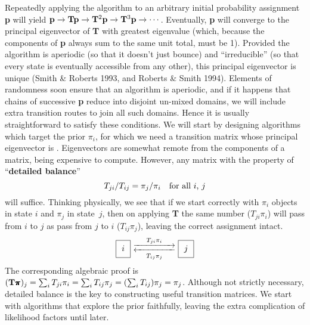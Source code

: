Repeatedly applying the algorithm to an arbitrary initial probability assignment {\bf p} 
will yield ${\bf p} \rightarrow {\bf T}{\bf p} \rightarrow {\bf T}^2{\bf p} \rightarrow {\bf T}^3{\bf p} \rightarrow \cdots\,$.
Eventually, {\bf p} will converge to the principal eigenvector of {\bf T} with greatest eigenvalue
(which, because the components of {\bf p} always sum to the same unit total, must be 1).
Provided the algorithm is aperiodic (so that it doesn't just bounce) and ``irreducible'' (so that every state is eventually accessible from any other),
this principal eigenvector is unique (Smith \& Roberts 1993, and Roberts \& Smith 1994).
Elements of randomness soon ensure that an algorithm is aperiodic, 
and if it happens that chains of successive {\bf p} reduce into disjoint un-mixed domains, 
we will include extra transition routes to join all such domains.
Hence it is usually straightforward to satisfy these conditions.
We will start by designing algorithms which target the prior $\pi_i$, for which we need a transition matrix whose principal eigenvector is \bfpi.
Eigenvectors are somewhat remote from the components of a matrix, being expensive to compute.  
However, any matrix with the property of ``{\bf detailed balance}''
$$
    T_{ji} / T_{ij} = \pi_j / \pi_i \quad \hbox{for all $i$, $j$}
$$
will suffice.
Thinking physically, we see that if we start correctly with $\pi_i$ objects in state $i$ and $\pi_j$ in state~$j$, 
then on applying {\bf T} the same number ($T_{ji}\pi_i$) will pass from $i$ to $j$ as pass from $j$ to $i$ ($T_{ij}\pi_j$), leaving the correct assignment intact.
$$
\hbox{
       \vbox{\offinterlineskip
             \hrule
             \halign{&\vrule#&\strut\ \ \hfil#\hfil\ &\vrule#\cr
                     height4pt & \omit && \omit \cr
                               &  $i$  &  \cr
                     height4pt & \omit && \omit \cr
                    }
             \hrule
            }
       \vbox{ \hbox{${\buildrel         T_{ji}\pi_i            \over      {\hbox to 50pt{\rightarrowfill}}}      $}
              \hbox{${\buildrel {\displaystyle{\hbox to 50pt{\leftarrowfill}}} \over {\scriptstyle{T_{ij}\pi_j}}}$} }
       \vbox{\offinterlineskip
             \hrule
             \halign{&\vrule#&\strut\ \ \hfil#\hfil\ &\vrule#\cr
                     height4pt & \omit && \omit \cr
                               &  $j$  &  \cr
                     height4pt & \omit && \omit \cr
                    }
             \hrule
            }
     }
$$
The corresponding algebraic proof is $ ({\bf T}\bfpi)_j = \sum_i T_{ji} \pi_i = \sum_i T_{ij} \pi_j = (\sum_i T_{ij}) \pi_j = \pi_j$.
Although not strictly necessary, detailed balance is the key to constructing useful transition matrices.  
We start with algorithms that explore the prior faithfully, leaving the extra complication of likelihood factors until later.

